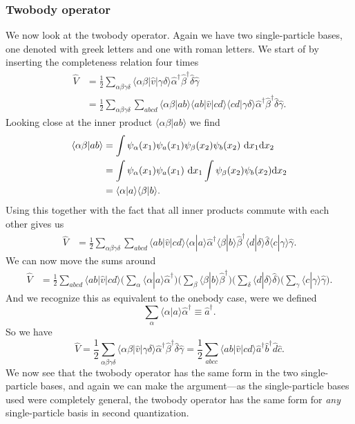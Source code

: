 \documentclass[a4paper, 11pt, notitlepage, english]{article}
\newcommand{\braket}[2]{\langle #1 | #2 \rangle}
\newcommand{\op}[1]{\hat{#1}}
\newcommand{\braopket}[3]{\langle #1 | {#2} | #3 \rangle}
\renewcommand{\d}{{\rm d}}
\begin{document}
\subsubsection*{Twobody operator}
We now look at the twobody operator. Again we have two single-particle bases, one denoted with greek letters and one with roman letters. We start of by inserting the completeness relation four times
\begin{align*}
\op{V} &= \frac{1}{2}\sum_{\alpha\beta\gamma\delta} \braopket{\alpha\beta}{\op{v}}{\gamma\delta} \op{\alpha}^\dag \op{\beta}^\dag \op{\delta} \op{\gamma} \\
&= \frac{1}{2}\sum_{\alpha\beta\gamma\delta} \sum_{abcd}\braket{\alpha\beta}{ab}\braopket{ab}{\op{v}}{cd}\braket{cd}{\gamma\delta} \op{\alpha}^\dag \op{\beta}^\dag \op{\delta} \op{\gamma}.
\end{align*}
Looking close at the inner product $\braket{\alpha\beta}{ab}$ we find
\begin{align*}
\braket{\alpha \beta}{ab} &= \int \psi_{\alpha}(x_1)\psi_a(x_1)\psi_{\beta}(x_2)\psi_b(x_2) \ \d x_1 \d x_2 \\
&= \int \psi_{\alpha}(x_1)\psi_a(x_1) \ \d x_1 \int \psi_{\beta}(x_2)\psi_b(x_2) \d x_2 \\
&= \braket{\alpha}{a}\braket{\beta}{b}.
\end{align*}
Using this together with the fact that all inner products commute with each other gives us
\begin{align*}
\op{V} &= \frac{1}{2}\sum_{\alpha\beta\gamma\delta} \sum_{abcd} \braopket{ab}{\op{v}}{cd} \braket{\alpha}{a} \op{\alpha}^\dag \braket{\beta}{b}\op{\beta}^\dag \braket{d}{\delta}\op{\delta} \braket{c}{\gamma} \op{\gamma}.
\end{align*}
We can now move the sums around
\begin{align*}
\op{V} &= \frac{1}{2} \sum_{abcd} \braopket{ab}{\op{v}}{cd} \bigg(\sum_{\alpha}\braket{\alpha}{a} \op{\alpha}^\dag \bigg)\bigg(\sum_{\beta}\braket{\beta}{b}\op{\beta}^\dag \bigg)\bigg(\sum_{\delta}\braket{d}{\delta}\op{\delta} \bigg)\bigg(\sum_{\gamma}\braket{c}{\gamma} \op{\gamma}\bigg).
\end{align*}
And we recognize this as equivalent to the onebody case, were we defined
$$\sum_\alpha \braket{\alpha}{a}\op{\alpha}^\dag \equiv \op{a}^\dag.$$
So we have
$$\op{V} = \frac{1}{2}\sum_{\alpha\beta\gamma\delta}\braopket{\alpha\beta}{\op{v}}{\gamma\delta}\op{\alpha}^\dag \op{\beta}^\dag \op{\delta} \op{\gamma} = \frac{1}{2}\sum_{abcc}\braopket{ab}{\op{v}}{cd}\op{a}^\dag \op{b}^\dag \op{d} \op{c}.$$
We now see that the twobody operator has the same form in the two single-particle bases, and again we can make the argument---as the single-particle bases used were completely general, the twobody operator has the same form for \emph{any} single-particle basis in second quantization.
\end{document}
